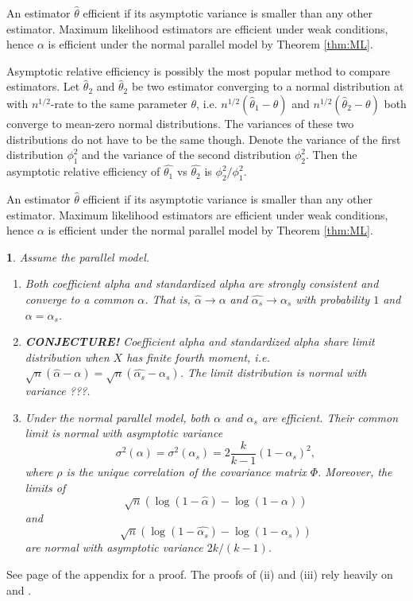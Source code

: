 \documentclass{article}
\makeatletter
\theoremstyle{plain}
\newtheorem{thm}{\protect\theoremname}
\theoremstyle{plain}
\theoremstyle{definition}
\theoremstyle{remark}
\theoremstyle{definition}
\theoremstyle{plain}
\theoremstyle{plain}
\theoremstyle{definition}
\newenvironment{proof}[1][\protect\proofname]{\par
	\normalfont\topsep6\p@\@plus6\p@\relax
	\trivlist
	\itemindent\parindent
	\item[\hskip\labelsep\scshape #1]\ignorespaces
}{%
	\endtrivlist\@endpefalse
}
\providecommand{\proofname}{Proof}
\providecommand{\theoremname}{Theorem}
\makeatother
\begin{document}
An estimator $\widehat{\theta}$ efficient if its asymptotic variance is smaller than any other estimator. Maximum likelihood estimators are efficient under weak conditions, hence $\alpha$ is efficient under the normal parallel model by Theorem \ref{thm:ML}.

Asymptotic relative efficiency is possibly the most popular method to compare estimators. Let $\widehat{\theta}_2$ and $\widehat{\theta}_2$ be two estimator converging to a normal distribution at with $n^{1/2}$-rate to the same parameter $\theta$, i.e. 
$n^{1/2}{(\widehat{\theta}_1 - \theta)}$ and $n^{1/2}{(\widehat{\theta}_2 - \theta)}$ both converge to mean-zero normal distributions. The variances of these two distributions do not have to be the same though. Denote the variance of the first distribution $\phi_1^2$ and the variance of the second distribution $\phi_2^2$. Then the asymptotic relative efficiency of $\widehat{\theta_1}$ vs $\widehat{\theta_2}$ is $\phi_2^2/\phi_1^2$.

An estimator $\widehat{\theta}$ efficient if its asymptotic variance is smaller than any other estimator. Maximum likelihood estimators are efficient under weak conditions, hence $\alpha$ is efficient under the normal parallel model by Theorem \ref{thm:ML}.

\begin{thm}
\label{thm:asymptotics}
Assume the parallel model.
\begin{enumerate}[label=(\roman*)]
    \item Both coefficient alpha and standardized alpha are strongly consistent and converge to a common $\alpha$. That is, $\widehat{\alpha}\to\alpha$ and $\widehat{\alpha_s}\to\alpha_s$ with probability $1$ and $\alpha = \alpha_s$.
    \item \textbf{CONJECTURE!} Coefficient alpha and standardized alpha share limit distribution when $X$ has finite fourth moment, i.e. $\sqrt{n}(\widehat{\alpha} - \alpha) = \sqrt{n}(\widehat{\alpha_s} - \alpha_s)$. The limit distribution is normal with variance ???.
    \item Under the normal parallel model, both $\alpha$ and $\alpha_s$ are efficient. Their common limit is normal with asymptotic variance 
    $$\sigma^{2}\left(\alpha\right)= \sigma^{2}\left(\alpha_{s}\right)=2\frac{k}{k-1}\left(1-\alpha_{s}\right)^{2},$$
    where $\rho$ is the unique correlation of the covariance matrix $\Phi$.
    Moreover,  the limits of $$\sqrt{n}\left(\log\left(1-\widehat{\alpha}\right)-\log\left(1-\alpha\right)\right)$$
    and $$\sqrt{n}\left(\log\left(1-\widehat{\alpha_{s}}\right)-\log\left(1-\alpha_{s}\right)\right)$$ are normal with asymptotic variance $2k/(k-1)$.
\end{enumerate}
\end{thm}    
\begin{proof}
See page \pageref{proof:asymptotics} of the appendix for a proof. The proofs of (ii) and (iii) rely heavily on \citep{Van_Zyl2000-si} and \citep{hayashi2005note}.
\end{proof}
\end{document}
